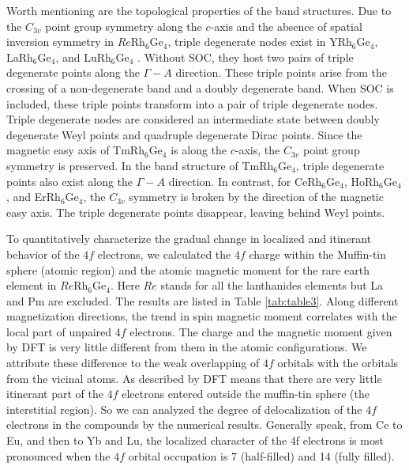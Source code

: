 \documentclass[preprint,12pt]{elsarticle}
\begin{document}
Worth mentioning are the topological properties of the band structures. Due to the $C_{3v}$ point group symmetry along the $c$-axis and the absence of spatial inversion symmetry in $Re$Rh$_6$Ge$_4$, triple degenerate nodes exist in YRh$_6$Ge$_4$, LaRh$_6$Ge$_4$, and LuRh$_6$Ge$_4$ \cite{Guo2018_PRB98-045134}.%
Without SOC, they host two pairs of triple degenerate points along the $\Gamma-A$ direction. These triple points arise from the crossing of a non-degenerate band and a doubly degenerate band. When SOC is included, these triple points transform into a pair of triple degenerate nodes. Triple degenerate nodes are considered an intermediate state between doubly degenerate Weyl points and quadruple degenerate Dirac points. Since the magnetic easy axis of TmRh$_6$Ge$_4$ is along the $c$-axis, the $C_{3v}$ point group symmetry is preserved. In the band structure of TmRh$_6$Ge$_4$, triple degenerate points also exist along the $\Gamma-A$ direction. In contrast, for CeRh$_6$Ge$_4$, HoRh$_6$Ge$_4$, and ErRh$_6$Ge$_4$, the $C_{3v}$ symmetry is broken by the direction of the magnetic easy axis. The triple degenerate points disappear, leaving behind Weyl points.


To quantitatively characterize the gradual change in localized and itinerant behavior of the $4f$ electrons, we calculated the $4f$ charge within the Muffin-tin sphere (atomic region) and the atomic magnetic moment for the rare earth element in $Re$Rh$_6$Ge$_4$. Here $Re$ stands for all the lanthanides elements but La and Pm are excluded. The results are listed in Table \ref{tab:table3}. Along different magnetization directions, the trend in spin magnetic moment correlates with the local part of unpaired $4f$ electrons. The charge and the magnetic moment given by DFT is very little different from them in the atomic configurations. We attribute these difference to the weak overlapping of $4f$ orbitals with the orbitals from the vicinal atoms. As described by DFT means that there are very little itinerant part of the $4f$ electrons entered outside the muffin-tin sphere (the interstitial region). So we can analyzed the degree of delocalization of the $4f$ electrons in the compounds by the numerical results. Generally speak, from Ce to Eu, and then to Yb and Lu, the localized character of the 4f electrons is most pronounced when the $4f$ orbital occupation is 7 (half-filled) and 14 (fully filled).
\end{document}

